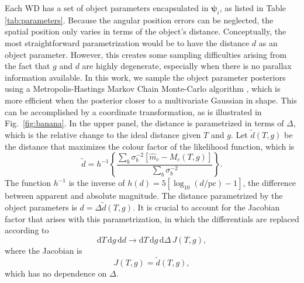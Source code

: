\documentclass[fleqn,usenatbib]{mnras}
\newcommand{\objp}{\boldsymbol{\psi}}
\newcommand{\Teff}{T}
\newcommand{\logg}{g}
\newcommand{\de}{\text{d}}
\begin{document}
Each WD has a set of object parameters encapsulated in $\objp_i$, as listed in Table \ref{tab:parameters}. Because the angular position errors can be neglected, the spatial position only varies in terms of the object's distance. Conceptually, the most straightforward parametrization would be to have the distance $d$ as an object parameter. However, this creates some sampling difficulties arising from the fact that $\logg$ and $d$ are highly degenerate, especially when there is no parallax information available. In this work, we sample the object parameter posteriors using a Metropolis-Hastings Markov Chain Monte-Carlo algorithm \citep{1953JChPh..21.1087M,brooks2011handbook}, which is more efficient when the posterior closer to a multivariate Gaussian in shape. This can be accomplished by a coordinate transformation, as is illustrated in Fig.~\ref{fig:banana}. In the upper panel, the distance is parametrized in terms of $\Delta$, which is the relative change to the ideal distance given $\Teff$ and $\logg$. Let $\tilde{d}(\Teff,\logg)$ be the distance that maximizes the colour factor of the likelihood function, which is
\begin{equation}
	\tilde{d} = 
    h^{-1}\left\{ \frac{\sum_b \sigma_b^{-2} [\hat{m}_c-M_c(\Teff,\logg)]}{\sum_b \sigma_b^{-2}} \right\}.
\end{equation}
The function $h^{-1}$ is the inverse of $h(d)=5[\log_{10}(d/\text{pc})-1]$, the difference between apparent and absolute magnitude. The distance parametrized by the object parameters is $d=\Delta\tilde{d}(\Teff,\logg)$. It is crucial to account for the Jacobian factor that arises with this parametrization, in which the differentials are replaced according to
\begin{equation}
	\de \Teff\, \de \logg\, \de d \rightarrow \de \Teff\, \de \logg\, \de \Delta\, J(\Teff,\logg),
\end{equation}
where the Jacobian is
\begin{equation}
	J(\Teff,\logg) = \tilde{d}(\Teff,\logg),
\end{equation}
which has no dependence on $\Delta$.
\end{document}
